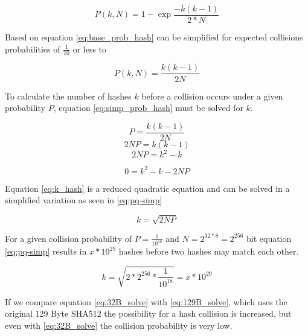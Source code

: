      \begin{equation}
         \label{eq:base_prob_hash}
         P(k,N) = 1 - \exp{\frac{-k(k-1)}{2 * N}}
     \end{equation}
     
     Based on \cite{TODO} equation \ref{eq:base_prob_hash} can be simplified for expected collisions probabilities of $\frac{1}{10}$ or less to
     
     \begin{equation}
         \label{eq:simp_prob_hash}
         P(k,N) = \frac{k(k - 1)}{2N} 
     \end{equation}
     
     To calculate the number of hashes $k$ before a collision occurs under a given probability $P$, equation \ref{eq:simp_prob_hash} must be solved for $k$.
     
     \begin{equation*}
         P = \frac{k(k - 1)}{2N}
     \end{equation*}
     \begin{equation*}
         2NP = k (k - 1)
     \end{equation*}
     \begin{equation*}
         2NP = k^2 - k
     \end{equation*}

     \begin{equation}
        \label{eq:k_hash}
         0 = k^2 - k - 2NP
     \end{equation}
     
     Equation \ref{eq:k_hash} is a reduced quadratic equation and can be solved in a simplified variation as seen in \ref{eq:pq-simp}
     
     \begin{equation}
         \label{eq:pq-simp}
         k = \sqrt{2NP}
     \end{equation}
     
     For a given collision probability of $P = \frac{1}{10^{18}}$ and $N = 2^{32 * 8} = 2^{256}$ bit equation \ref{eq:pq-simp} results in $x * 10^{29}$ hashes before two hashes may match each other.
     
     \begin{equation}
         \label{eq:32B_solve}
         k = \sqrt{2 * 2^{256} * \frac{1}{10^{18}}} = x * 10^{29}
     \end{equation}
     
     If we compare equation \ref{eq:32B_solve} with \ref{eq:129B_solve}, which uses the original 129 Byte SHA512 the possibility for a hash collision is increased, but even with \ref{eq:32B_solve} the collision probability is very low.
     
